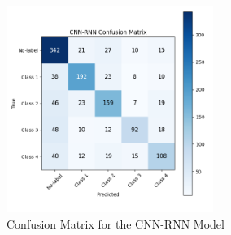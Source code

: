 \begin{figure}[H]
\centering
\includegraphics[width=0.6\textwidth]{images/Supervised_Results/cnn-rnn_confusion_matrix.png}
\caption{Confusion Matrix for the CNN-RNN Model}
\label{fig:cnn-rnn-confusion-matrix}
\end{figure}

